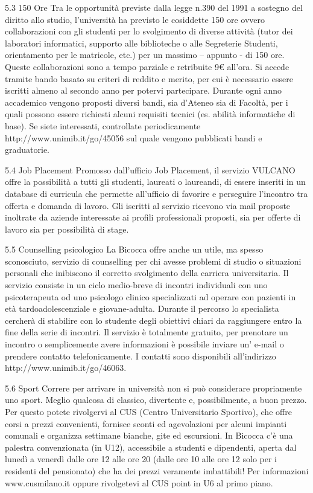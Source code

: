 5.3 150 Ore
Tra le opportunità previste dalla legge n.390 del 1991 a sostegno del diritto allo studio, l'università ha previsto le cosiddette 150 ore ovvero collaborazioni con gli studenti per lo svolgimento di diverse attività (tutor dei laboratori informatici, supporto alle biblioteche o alle Segreterie Studenti, orientamento per le matricole, etc.) per un massimo – appunto - di 150 ore. Queste collaborazioni sono a tempo parziale e retribuite 9€ all'ora. Si accede tramite bando basato su criteri di reddito e merito, per cui è necessario essere iscritti almeno al secondo anno per potervi partecipare. Durante ogni anno accademico vengono proposti diversi bandi, sia d'Ateneo sia di Facoltà, per i quali possono essere richiesti alcuni requisiti tecnici (es. abilità informatiche di base). Se siete interessati, controllate periodicamente http://www.unimib.it/go/45056 sul quale vengono pubblicati bandi e graduatorie. 

5.4 Job Placement
Promosso dall'ufficio Job Placement, il servizio VULCANO offre la possibilità a tutti gli studenti, laureati o laureandi, di essere inseriti in un database di curricula che permette all'ufficio di favorire e perseguire l'incontro tra offerta e domanda di lavoro. Gli iscritti al servizio ricevono via mail proposte inoltrate da aziende interessate ai profili professionali proposti, sia per offerte di lavoro sia per possibilità di stage. 

5.5 Counselling psicologico
La Bicocca offre anche un utile, ma spesso sconosciuto, servizio di counselling per chi avesse problemi di studio o situazioni personali che inibiscono il corretto svolgimento della carriera universitaria. Il servizio consiste in un ciclo medio-breve di incontri individuali con uno psicoterapeuta od uno psicologo clinico specializzati ad operare con pazienti in età tardoadolescenziale e giovane-adulta. Durante il percorso lo specialista cercherà di stabilire con lo studente degli obiettivi chiari da raggiungere entro la fine della serie di incontri. 
Il servizio è totalmente gratuito, per prenotare un incontro o semplicemente avere informazioni è possibile inviare un' e-mail o prendere contatto telefonicamente. I contatti sono disponibili all'indirizzo http://www.unimib.it/go/46063.

5.6 Sport
Correre per arrivare in università non si può considerare propriamente uno sport. Meglio qualcosa di classico, divertente e, possibilmente, a buon prezzo. Per questo potete rivolgervi al CUS (Centro Universitario Sportivo), che offre corsi a prezzi convenienti, fornisce sconti ed agevolazioni per alcuni impianti comunali e organizza settimane bianche, gite ed escursioni. In Bicocca c'è una palestra convenzionata (in U12), accessibile a studenti e dipendenti,  aperta dal lunedì a venerdì dalle ore 12 alle ore 20 (dalle ore 10 alle ore 12 solo per i residenti del pensionato) che ha dei prezzi veramente imbattibili! Per informazioni www.cusmilano.it oppure rivolgetevi al CUS point in U6 al primo piano. 

